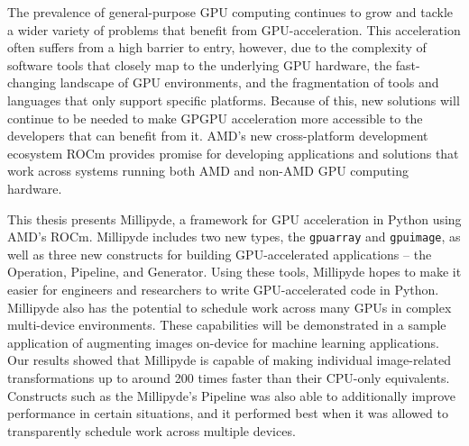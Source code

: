 The prevalence of general-purpose GPU computing continues to grow and tackle a wider variety of problems that benefit from GPU-acceleration. This acceleration often suffers from a high barrier to entry, however, due to the complexity of software tools that closely map to the underlying GPU hardware, the fast-changing landscape of GPU environments, and the fragmentation of tools and languages that only support specific platforms. Because of this, new solutions will continue to be needed to make GPGPU acceleration more accessible to the developers that can benefit from it. AMD's new cross-platform development ecosystem ROCm provides promise for developing applications and solutions that work across systems running both AMD and non-AMD GPU computing hardware.

\quad This thesis presents Millipyde, a framework for GPU acceleration in Python using AMD's ROCm. Millipyde includes two new types, the \verb|gpuarray| and \verb|gpuimage|, as well as three new constructs for building GPU-accelerated applications -- the Operation, Pipeline, and Generator. Using these tools, Millipyde hopes to make it easier for engineers and researchers to write GPU-accelerated code in Python. Millipyde also has the potential to schedule work across many GPUs in complex multi-device environments. These capabilities will be demonstrated in a sample application of augmenting images on-device for machine learning applications. Our results showed that Millipyde is capable of making individual image-related transformations up to around 200 times faster than their CPU-only equivalents. Constructs such as the Millipyde's Pipeline was also able to additionally improve performance in certain situations, and it performed best when it was allowed to transparently schedule work across multiple devices. 
